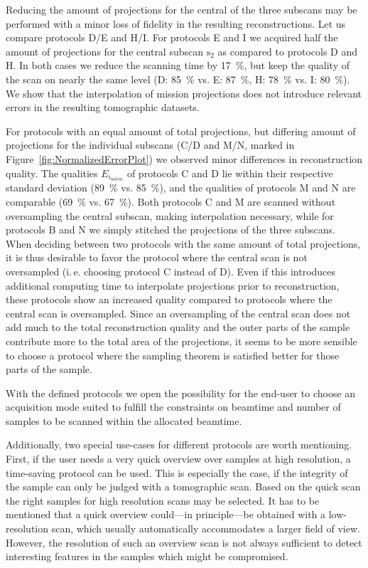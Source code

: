 \documentclass[preprint,s]{iucr}
\begin{document}
Reducing the amount of projections for the central of the three subscans may be performed with a minor loss of fidelity in the resulting reconstructions. Let us compare protocols D/E and H/I. For protocols E and I we acquired half the amount of projections for the central subscan $\textrm{s}_{2}$ as compared to protocols D and H. In both cases we reduce the scanning time by \SI{17}{\percent}, but keep the quality of the scan on nearly the same level (D: \SI{85}{\percent} vs. E: \SI{87}{\percent}, H: \SI{78}{\percent} vs. I: \SI{80}{\percent}).
We show that the interpolation of mission projections does not introduce relevant errors in the resulting tomographic datasets.

For protocols with an equal amount of total projections, but differing amount of projections for the individual subscans (C/D and M/N, marked in Figure~\ref{fig:NormalizedErrorPlot}) we observed minor differences in reconstruction quality. The qualities $E_{i_{norm}}$ of protocols C and D lie within their respective standard deviation (\SI{89}{\percent} vs. \SI{85}{\percent}), and the qualities of protocols M and N are comparable (\SI{69}{\percent} vs. \SI{67}{\percent}). Both protocols C and M are scanned without oversampling the central subscan, making interpolation necessary, while for protocols B and N we simply stitched the projections of the three subscans. When deciding between two protocols with the same amount of total projections, it is thus desirable to favor the protocol where the central scan is not oversampled (i.\,e. choosing protocol C instead of D). Even if this introduces additional computing time to interpolate projections prior to reconstruction, these protocols show an increased quality compared to protocols where the central scan is oversampled. Since an oversampling of the central scan does not add much to the total reconstruction quality and the outer parts of the sample contribute more to the total area of the projections, it seems to be more sensible to choose a protocol where the sampling theorem is satisfied better for those parts of the sample.

With the defined protocols we open the possibility for the end-user to choose an acquisition mode suited to fulfill the constraints on beamtime and number of samples to be scanned within the allocated beamtime. 

Additionally, two special use-cases for different protocols are worth mentioning. First, if the user needs a very quick overview over samples at high resolution, a time-saving protocol can be used. This is especially the case, if the integrity of the sample can only be judged with a tomographic scan. Based on the quick scan the right samples for high resolution scans may be selected. It has to be mentioned that a quick overview could---in principle---be obtained with a low-resolution scan, which usually automatically accommodates a larger field of view. However, the resolution of such an overview scan is not always sufficient to detect interesting features in the samples which might be compromised.
\end{document}
